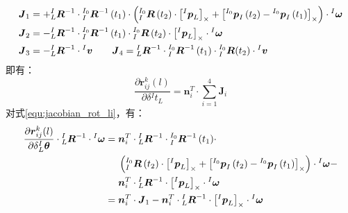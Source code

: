\begin{equation}
  \begin{aligned}
     & \boldsymbol{J}_1=+{{^{I}_{L}}\boldsymbol{R}^{-1}}\cdot{{^{I_0}_{I}}\boldsymbol{R}^{-1}
      \left( t_1\right) }\cdot
    \left(
    {{^{I_0}_{I}}\boldsymbol{R}\left( t_2\right) }\cdot\left[ {^{I}\boldsymbol{p}_L} \right]_\times
    +\left[ {^{I_0}\boldsymbol{p}_I\left( t_2\right)}-{^{I_0}\boldsymbol{p}_I\left( t_1\right)} \right]_\times
    \right)
    \cdot{^{I}\boldsymbol{\omega}}
    \\
     & \boldsymbol{J}_2=-{{^{I}_{L}}\boldsymbol{R}^{-1}}\cdot{{^{I_0}_{I}}\boldsymbol{R}^{-1}
      \left( t_1\right) }\cdot{{^{I_0}_{I}}\boldsymbol{R}\left( t_2\right) }
    \cdot\left[ {^{I}\boldsymbol{p}_L} \right]_\times
    \cdot{^{I}\boldsymbol{\omega}}
    \\
     & \boldsymbol{J}_3=-{{^{I}_{L}}\boldsymbol{R}^{-1}}\cdot{^{I}\boldsymbol{v}}
    \quad\quad
    \boldsymbol{J}_4=
    {{^{I}_{L}}\boldsymbol{R}^{-1}}\cdot{{^{I_0}_{I}}\boldsymbol{R}^{-1}\left( t_1\right) }
    \cdot
    {^{I_0}_{I}\boldsymbol{R}}(t_2)\cdot{^{I}\boldsymbol{v}}
  \end{aligned}
\end{equation}
即有：
\begin{equation}
  \frac{\partial \boldsymbol{r}_{ij}^k(l)}{\partial \delta {^{I}t_{L}}}=
  \boldsymbol{n}_i^T\cdot\sum_{i=1}^{4}\boldsymbol{J}_i
\end{equation}
对式\ref{equ:jacobian_rot_li}，有：
\begin{equation}
  \begin{aligned}
    \frac{\partial \boldsymbol{r}_{ij}^k(l)}{\partial \delta {^{I}_{L}\boldsymbol{\theta}}}
    \cdot{{^{I}_{L}}\boldsymbol{R}^{-1}}\cdot{^{I}\boldsymbol{\omega}} =\;&
    \boldsymbol{n}_i^T\cdot
    {{^{I}_{L}}\boldsymbol{R}^{-1}}\cdot{{^{I_0}_{I}}\boldsymbol{R}^{-1}
      \left( t_1\right) }\cdot
    \\\;&\left(
    {{^{I_0}_{I}}\boldsymbol{R}\left( t_2\right) }\cdot\left[ {^{I}\boldsymbol{p}_L} \right]_\times
    +\left[ {^{I_0}\boldsymbol{p}_I\left( t_2\right)}-{^{I_0}\boldsymbol{p}_I\left( t_1\right)} \right]_\times
    \right)
    \cdot{^{I}\boldsymbol{\omega}}-
    \\\;&
    \boldsymbol{n}_i^T\cdot
    {{^{I}_{L}}\boldsymbol{R}^{-1}}\cdot\left[ {^{I}\boldsymbol{p}_L} \right]_\times\cdot{^{I}\boldsymbol{\omega}}
    \\=\;&\boldsymbol{n}_i^T\cdot\boldsymbol{J}_1-
    \boldsymbol{n}_i^T\cdot
    {{^{I}_{L}}\boldsymbol{R}^{-1}}\cdot\left[ {^{I}\boldsymbol{p}_L} \right]_\times\cdot{^{I}\boldsymbol{\omega}}
  \end{aligned}
\end{equation}

